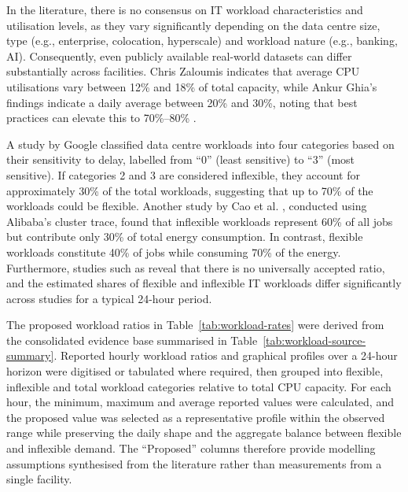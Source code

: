 \documentclass[lettersize,journal]{IEEEtran}
\newcommand{\rev}[1]{\textcolor{blue!70!black}{#1}}
\begin{document}
In the literature, there is no consensus on IT workload characteristics and utilisation levels, as they vary significantly depending on the data centre size, type (e.g., enterprise, colocation, hyperscale) and workload nature (e.g., banking, AI). Consequently, even publicly available real-world datasets can differ substantially across facilities. Chris Zaloumis \cite{Zaloumis2022IBM} indicates that average CPU utilisations vary between 12\% and 18\% of total capacity, while Ankur Ghia's findings indicate a daily average between 20\% and 30\%, noting that best practices can elevate this to 70\%--80\% \cite{Ghia2011McKinsey}. 
 
 A study by Google \cite{6779441} classified data centre workloads into four categories based on their sensitivity to delay, labelled from ``0'' (least sensitive) to ``3'' (most sensitive). If categories 2 and 3 are considered inflexible, they account for approximately 30\% of the total workloads, suggesting that up to 70\% of the workloads could be flexible. Another study by Cao et al. \cite{Cao2022ApEn}, conducted using Alibaba's cluster trace, found that inflexible workloads represent 60\% of all jobs but contribute only 30\% of total energy consumption. In contrast, flexible workloads constitute 40\% of jobs while consuming 70\% of the energy. Furthermore, studies such as \cite{Misaghian2023TIA,Xu2023SPIE,Zhou2024IJEPES,Fu2020ApEn,Liu2012PER} reveal that there is no universally accepted ratio, and the estimated shares of flexible and inflexible IT workloads differ significantly across studies for a typical 24-hour period. 

\rev{The proposed workload ratios in Table~\ref{tab:workload-rates} were derived from the consolidated evidence base summarised in Table~\ref{tab:workload-source-summary}. Reported hourly workload ratios and graphical profiles over a 24-hour horizon were digitised or tabulated where required, then grouped into flexible, inflexible and total workload categories relative to total CPU capacity. For each hour, the minimum, maximum and average reported values were calculated, and the proposed value was selected as a representative profile within the observed range while preserving the daily shape and the aggregate balance between flexible and inflexible demand. The ``Proposed'' columns therefore provide modelling assumptions synthesised from the literature rather than measurements from a single facility.}
\end{document}
